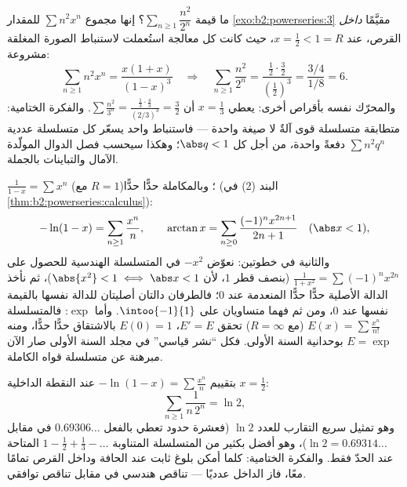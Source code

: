 \begin{example}\label{ex:b2:powerseries:evaluate}
ما قيمة $\sum_{n\geq1}\dfrac{n^2}{2^n}$؟ إنها مجموع
$\sum n^2x^n$ للمقدار \cref{exo:b2:powerseries:3} مقيَّمًا
\emph{داخل} القرص، عند $x = \frac12 < 1 = R$، حيث كانت كل
معالجة استُعملت لاستنباط الصورة المغلقة مشروعة:
\[
\sum_{n\geq1} n^2x^n = \frac{x(1+x)}{(1-x)^3}
\quad\Longrightarrow\quad
\sum_{n\geq1}\frac{n^2}{2^n}
= \frac{\frac12\cdot\frac32}{(\frac12)^3}
= \frac{3/4}{1/8} = 6 .
\]
والمحرّك نفسه بأقراص أخرى: يعطي $x = \frac13$ أن
$\sum\frac{n^2}{3^n} = \frac{\frac13\cdot\frac43}{(2/3)^3} =
\frac32$. والفكرة الختامية: متطابقة متسلسلة قوى
آلةٌ لا صيغة واحدة --- فاستنباط واحد يسعّر كل
متسلسلة عددية $\sum n^2q^n$ دفعةً واحدة، من أجل كل $\abs q < 1$؛
وهكذا سيحسب فصل الدوال المولّدة
الآمال والتباينات بالجملة.
\end{example}

\begin{example}\label{ex:b2:powerseries:classics}
$\displaystyle\frac{1}{1 - x} = \sum x^n$ (مع $R = 1$)؛ وبالمكاملة
حدًّا حدًّا (البند (2) في \cref{thm:b2:powerseries:calculus}):
\[
-\ln(1 - x) = \sum_{n\geq1} \frac{x^n}{n},
\qquad
\arctan x = \sum_{n \geq 0} \frac{(-1)^n x^{2n+1}}{2n+1}
\quad (\abs x < 1),
\]
والثانية في خطوتين: نعوّض $-x^2$ في المتسلسلة
الهندسية للحصول على $\frac{1}{1+x^2} = \sum(-1)^nx^{2n}$ (بنصف قطر
$1$، لأن $\abs{x^2} < 1 \iff \abs x < 1$)، ثم نأخذ
الدالة الأصلية حدًّا حدًّا المنعدمة عند $0$؛ فالطرفان
دالتان أصليتان للدالة نفسها بالقيمة نفسها عند $0$،
ومن ثم فهما متساويان على $\intoo{-1}{1}$. وأما $\exp$:
فالمتسلسلة $E(x) = \sum \frac{x^n}{n!}$ (مع $R = \infty$) تحقق
$E' = E$، $E(0) = 1$ بالاشتقاق حدًّا حدًّا، ومنه $E = \exp$ بوحدانية
السنة الأولى. فكل ``نشر قياسي'' في مجلد السنة
الأولى صار الآن مبرهنة عن متسلسلة قواه الكاملة.
\end{example}

\begin{example}\label{ex:b2:powerseries:lntwo}
بتقييم $-\ln(1-x) = \sum\frac{x^n}{n}$ عند النقطة
الداخلية $x = \frac12$:
\[
\sum_{n\geq1}\frac{1}{n\,2^n} = \ln 2 ,
\]
وهو تمثيل سريع التقارب للعدد $\ln 2$ (فعشرة حدود تعطي بالفعل
$0.69306\ldots$ في مقابل $\ln 2 = 0.69314\ldots$)، وهو أفضل بكثير
من المتسلسلة المتناوبة $1 - \frac12 + \frac13 -
\dots$ المتاحة عند الحدّ فقط. والفكرة الختامية:
كلما أمكن بلوغ ثابت عند الحافة وداخل القرص تمامًا معًا،
فاز الداخل عدديًا --- تناقص هندسي في مقابل
تناقص توافقي.
\end{example}

